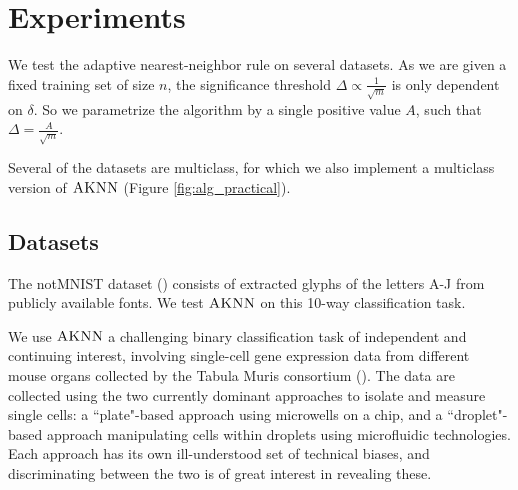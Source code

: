 \documentclass{article}
\newcommand{\samp}{S}
\newcommand{\algname}{\textsc{AKNN}}
\newcommand{\new}[1]{\color{red} #1}
\begin{document}
%


\section{Experiments}

We test the adaptive nearest-neighbor rule on several datasets. As we are given a fixed training set of size $n$, the significance threshold $\Delta \propto \frac{1}{\sqrt{m}}$ is only dependent on $\delta$. So we parametrize the algorithm by a single positive value $A$, such that $\Delta = \frac{A}{\sqrt{m}}$. 

Several of the datasets are multiclass, for which we also implement a multiclass version of $\algname$ (Figure \ref{fig:alg_practical}).


\subsection{Datasets}

The notMNIST dataset (\cite{notMNIST}) consists of extracted glyphs of the letters A-J from publicly available fonts. We test $\algname$ on this 10-way classification task.

We use $\algname$ a challenging binary classification task of independent and continuing interest, involving single-cell gene expression data from different mouse organs collected by the Tabula Muris consortium (\cite{tabulamuris18}). The data are collected using the two currently dominant approaches to isolate and measure single cells: a ``plate"-based approach using microwells on a chip, and a ``droplet"-based approach manipulating cells within droplets using microfluidic technologies. Each approach has its own ill-understood set of technical biases, and discriminating between the two is of great interest in revealing these.
\end{document}
